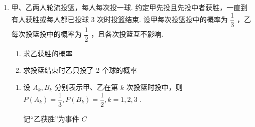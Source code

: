 \begin{enumerate}
\begin{enumerate}
\begin{jieda}
\begin{enumerate}
                两次抽到 40 元，一次抽到 30 元的概率 ${P}_{1} = 3 \times  {\left( \dfrac{1}{6}\right) }^{2} \times  \dfrac{1}{3} = \dfrac{1}{36}$ ,
                
                两次抽到 40 元,一次抽到 20 元的概率 ${P}_{2} = 3 \times  {\left( \dfrac{1}{6}\right) }^{2} \times  \dfrac{1}{3} = \dfrac{1}{36}$ ,
                
                两次抽到 40 元，一次抽到 10 元的概率 ${P}_{3} = 3 \times  {\left( \dfrac{1}{6}\right) }^{2} \times  \dfrac{1}{6} = \dfrac{1}{72}$ ，
                
                两次抽到 30 元，一次抽到 40 元的概率 ${P}_{4} = 3 \times  {\left( \dfrac{1}{3}\right) }^{2} \times  \dfrac{1}{6} = \dfrac{1}{18}$ .
                
                两次抽到 30 元，一次抽到 20 元的概率 ${P}_{5} = 3 \times  {\left( \dfrac{1}{3}\right) }^{2} \times  \dfrac{1}{3} = \dfrac{1}{9}$ ，
                
                两次抽到 20 元，一次抽到 40 元的概率 ${P}_{6} = 3 \times  {\left( \dfrac{1}{3}\right) }^{2} \times  \dfrac{1}{6} = \dfrac{1}{18}$
                
                所以获得的奖品价值总和不低于 80 元的概率为:$P = \dfrac{1}{18} + \dfrac{1}{9} + \dfrac{1}{18} + \dfrac{1}{72} + \dfrac{1}{36} + \dfrac{1}{36} = \dfrac{7}{24}.$
            \end{enumerate}
        \end{jieda}
        
        \item 甲、乙两人轮流投篮，每人每次投一球. 约定甲先投且先投中者获胜，一直到有人获胜或每人都已投球 3 次时投篮结束. 设甲每次投篮投中的概率为 $\dfrac{1}{3}$ ，乙每次投篮投中的概率为 $\dfrac{1}{2}$ ，且各次投篮互不影响.
        \begin{enumerate}
            \item 求乙获胜的概率
            \item 求投篮结束时乙只投了 2 个球的概率
        \end{enumerate}
        \begin{jieda}
            \begin{enumerate}
                \item 设 ${A_k},{B_k}$ 分别表示甲、乙在第 $k$ 次投篮时投中，则 $P\left( {A}_{k}\right)  = \dfrac{1}{3},P\left( {B}_{k}\right)  = \dfrac{1}{2},k = 1,2,3$ .
                
                记“乙获胜”为事件 $C$
                

\end{enumerate}
\end{jieda}
\end{enumerate}
\end{enumerate}
